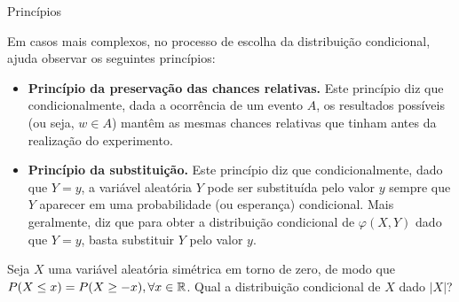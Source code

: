 \begin{frame}
\begin{block}{Princípios}

Em casos mais complexos, no processo de escolha da distribuição condicional, ajuda observar os seguintes
princípios:

\begin{itemize}
\item {\bf Princípio da preservação das chances relativas.} Este
princípio diz que condicionalmente, dada a ocorrência de um evento
$A$, os resultados possíveis (ou seja, $w\in A$) mantêm as mesmas
chances relativas que tinham antes da realização do experimento.

\item {\bf Princípio da substituição.} Este princípio diz que
condicionalmente, dado que $Y=y$, a variável aleatória $Y$ pode ser
substituída pelo valor $y$ sempre que $Y$ aparecer em uma
probabilidade (ou esperança) condicional. Mais geralmente, diz que
para obter a distribuição condicional de $\varphi(X,Y)$ dado que
$Y=y$, basta substituir $Y$ pelo valor $y$.
\end{itemize}
\end{block}

\begin{exem}
Seja $X$ uma variável aleatória simétrica em torno de zero, de modo que $P(X\leq x)=P(X\geq -x), \forall x\in \mathbb{R}$. Qual a distribuição condicional de $X$ dado $|X|$?
\end{exem}


\end{frame}

